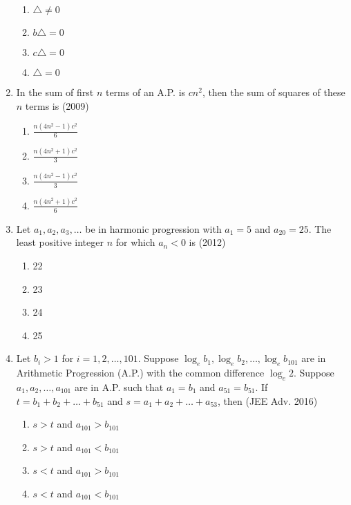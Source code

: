 \documentclass[journal,12pt,twocolumn]{IEEEtran}
\theoremstyle{remark}
\begin{document}
\begin{enumerate}
                \begin{enumerate}
                    \item $\triangle\neq0$
                    \item $b\triangle=0$
                    \item $c\triangle=0$
                    \item $\triangle=0$
                \end{enumerate}
\item In the sum of first $n$ terms of an A.P. is $cn^2$, then the sum of squares of these $n$ terms is \hfill(2009)
                \begin{enumerate}
                    \item $\frac{n(4n^2-1)c^2}{6}$
                    \item $\frac{n(4n^2+1)c^2}{3}$
                    \item $\frac{n(4n^2-1)c^2}{3}$
                    \item $\frac{n(4n^2+1)c^2}{6}$
		\end{enumerate}              
\item Let ${a_1,a_2,a_3,\dots}$ be in harmonic progression with ${a_1}=5$ and ${a_{20}}=25$. The least positive integer $n$ for which ${a_n<0}$ is \hfill(2012)
                \begin{enumerate}
                    \item 22
                    \item 23
                    \item 24
                    \item 25
                    \end{enumerate}
\item Let ${b_i}>1$ for $i=1,2,\dots,101$. Suppose ${\log_e}{b_1},{\log_e}{b_2},\dots,{\log_e}{b_{101}}$ are in Arithmetic Progression (A.P.) with the common difference ${\log_e}2$. Suppose ${a_1,a_2,\dots,a_{101}}$ are in A.P. such that ${a_1=b_1}$ and ${a_{51}=b_{51}}$. If $t={b_1+b_2+\dots+b_{51}}$ and $s={a_1+a_2+\dots+a_{53}}$, then \hfill (JEE Adv. 2016)
                    \begin{enumerate}
                        \item $s>t$ and ${a_{101}>b_{101}}$
                        \item $s>t$ and ${a_{101}<b_{101}}$
                        \item $s<t$ and ${a_{101}>b_{101}}$
                        \item $s<t$ and ${a_{101}<b_{101}}$
                        \end{enumerate}
                        
    
\end{enumerate}
\end{document}
